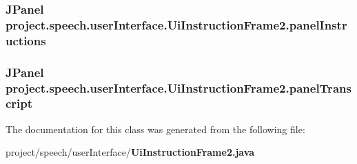 \subsubsection[{panel\+Instructions}]{\setlength{\rightskip}{0pt plus 5cm}J\+Panel project.\+speech.\+user\+Interface.\+Ui\+Instruction\+Frame2.\+panel\+Instructions\hspace{0.3cm}{\ttfamily [private]}}\label{classproject_1_1speech_1_1user_interface_1_1_ui_instruction_frame2_ac2544a6dde59201deb0321eba1a07470}
\subsubsection[{panel\+Transcript}]{\setlength{\rightskip}{0pt plus 5cm}J\+Panel project.\+speech.\+user\+Interface.\+Ui\+Instruction\+Frame2.\+panel\+Transcript\hspace{0.3cm}{\ttfamily [private]}}\label{classproject_1_1speech_1_1user_interface_1_1_ui_instruction_frame2_a2323bbb36d7b03268e82fbe45ef19e89}


The documentation for this class was generated from the following file\+:\begin{DoxyCompactItemize}
\item 
project/speech/user\+Interface/{\bf Ui\+Instruction\+Frame2.\+java}\end{DoxyCompactItemize}
